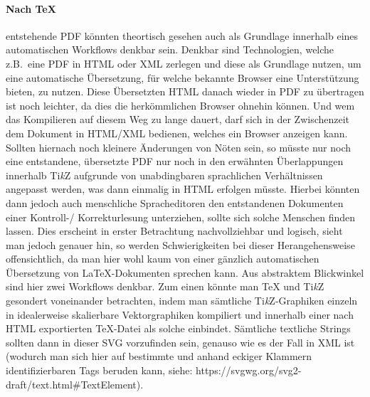 \paragraph*{Nach TeX} entstehende PDF könnten theortisch gesehen auch als Grundlage innerhalb eines automatischen Workflows denkbar sein. Denkbar sind Technologien, welche z.B.\ eine PDF in HTML oder XML zerlegen und diese als Grundlage nutzen, um eine automatische Übersetzung, für welche bekannte Browser eine Unterstützung bieten, zu nutzen. Diese Übersetzten HTML danach wieder in PDF zu übertragen ist noch leichter, da dies die herkömmlichen Browser ohnehin können. Und wem das Kompilieren auf diesem Weg zu lange dauert, darf sich in der Zwischenzeit dem Dokument in HTML/XML bedienen, welches ein Browser anzeigen kann. Sollten hiernach noch kleinere Änderungen von Nöten sein, so müsste nur noch eine entstandene, übersetzte PDF nur noch in den erwähnten Überlappungen innerhalb Ti\textit{k}Z aufgrunde von unabdingbaren sprachlichen Verhältnissen angepasst werden, was dann einmalig in HTML erfolgen müsste. Hierbei könnten dann jedoch auch menschliche Spracheditoren den entstandenen Dokumenten einer Kontroll-/ Korrekturlesung unterziehen, sollte sich solche Menschen finden lassen. Dies erscheint in erster Betrachtung nachvollziehbar und logisch, sieht man jedoch genauer hin, so werden Schwierigkeiten bei dieser Herangehensweise offensichtlich, da man hier wohl kaum von einer gänzlich automatischen Übersetzung von \LaTeX{}-Dokumenten sprechen kann. Aus abstraktem Blickwinkel sind hier zwei Workflows denkbar. Zum einen könnte man \TeX{} und Ti\textit{k}Z gesondert voneinander betrachten, indem man sämtliche Ti\textit{k}Z-Graphiken einzeln in idealerweise skalierbare Vektorgraphiken kompiliert und innerhalb einer nach HTML exportierten \TeX{}-Datei als solche einbindet. Sämtliche textliche Strings sollten dann in dieser SVG vorzufinden sein, genauso wie es der Fall in XML ist (wodurch man sich hier auf bestimmte und anhand eckiger Klammern identifizierbaren Tags beruden kann, siehe: https://svgwg.org/svg2-draft/text.html#TextElement).%

